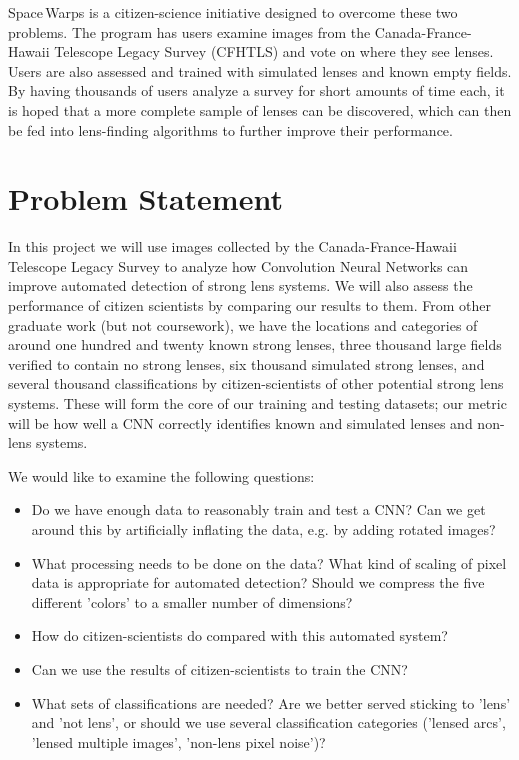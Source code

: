 \documentclass[10pt,twocolumn,letterpaper]{article}
\begin{document}
{\sc Space\,Warps}\xspace is a citizen-science initiative designed to overcome
these two problems. The program has users examine images from the
Canada-France-Hawaii Telescope Legacy Survey (CFHTLS) and vote on where they
see lenses. Users are also assessed and trained with simulated lenses and known
empty fields. By having thousands of users analyze a survey for short amounts
of time each, it is hoped that a more complete sample of lenses can be
discovered, which can then be fed into lens-finding algorithms to further
improve their performance.

\section{Problem Statement}

In this project we will use images collected by the Canada-France-Hawaii
Telescope Legacy Survey to analyze how Convolution Neural Networks can improve
automated detection of strong lens systems. We will also assess the performance
of citizen scientists by comparing our results to them. From other graduate
work (but not coursework), we have the locations and categories of around one
hundred and twenty known strong lenses, three thousand large fields verified to
contain no strong lenses, six thousand simulated strong lenses, and several
thousand classifications by citizen-scientists of other potential strong lens
systems.  These will form the core of our training and testing datasets; our
metric will be how well a CNN correctly identifies known and simulated lenses
and non-lens systems.

We would like to examine the following questions:
\begin{itemize}
\item{ Do we have enough data to reasonably train and test a CNN? Can we get
       around this by artificially inflating the data, e.g. by adding rotated
     images?}
\item{ What processing needs to be done on the data? What kind of scaling of
       pixel data is appropriate for automated detection? Should we compress
     the five different 'colors' to a smaller number of dimensions?}
   \item{ How do citizen-scientists do compared with this automated system?}
   \item{Can we use the results of citizen-scientists to train the CNN?}
\item{What sets of classifications are needed? Are we better served sticking
       to 'lens' and 'not lens', or should we use several classification
       categories ('lensed arcs', 'lensed multiple images', 'non-lens pixel
     noise')?}
\end{itemize}
\end{document}
